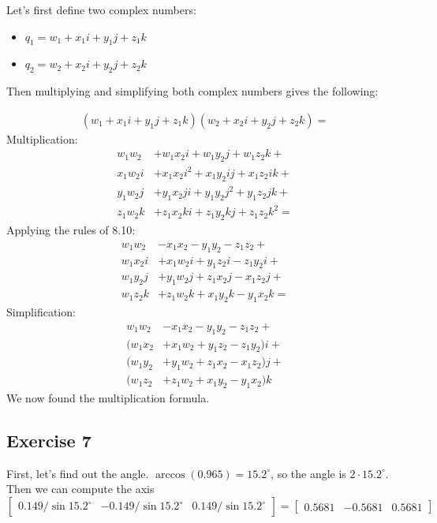 \documentclass[11pt]{article}
\begin{document}
Let's first define two complex numbers:

\begin{itemize}
	\item $q_1=w_1+x_1i+y_1j+z_1k$
	\item $q_2=w_2+x_2i+y_2j+z_2k$
\end{itemize}

Then multiplying and simplifying both complex numbers gives the following:

\begin{align*}
	(w_1+x_1i+y_1j+z_1k)(w_2+x_2i+y_2j+z_2k)=
\end{align*}
Multiplication:
\begin{align*}
	w_1w_2 &+ w_1x_2i + w_1y_2j + w_1z_2k + \\
	x_1w_2i &+ x_1x_2i^2 + x_1y_2ij + x_1z_2ik + \\
	y_1w_2j &+ y_1x_2ji + y_1y_2j^2 + y_1z_2jk + \\
	z_1w_2k &+ z_1x_2ki + z_1y_2kj + z_1z_2k^2 =	
\end{align*}
Applying the rules of 8.10:
\begin{align*}
	w_1w_2  &- x_1x_2 - y_1y_2 - z_1z_2 + \\
	w_1x_2i &+ x_1w_2i + y_1z_2i - z_1y_2i + \\
	w_1y_2j &+ y_1w_2j + z_1x_2j - x_1z_2j + \\
	w_1z_2k &+ z_1w_2k + x_1y_2k - y_1x_2k =
\end{align*}
Simplification:
\begin{align*}
	w_1w_2 &- x_1x_2 - y_1y_2 - z_1z_2 + \\
	(w_1x_2 &+ x_1w_2 + y_1z_2 - z_1y_2)i + \\
	(w_1y_2 &+ y_1w_2 + z_1x_2 - x_1z_2)j + \\
	(w_1z_2 &+ z_1w_2 + x_1y_2 - y_1x_2)k
\end{align*}
We now found the multiplication formula.

\subsection{Exercise 7}

First, let's find out the angle. $\arccos(0.965)=15.2^\circ$, so the angle is $2\cdot15.2^\circ$. Then we can compute the axis $\begin{bmatrix}
0.149 / \sin 15.2^\circ & -0.149 / \sin 15.2^\circ  & 0.149 / \sin 15.2^\circ 
\end{bmatrix}=\begin{bmatrix}
0.5681 & -0.5681 & 0.5681 
\end{bmatrix}$
\end{document}
